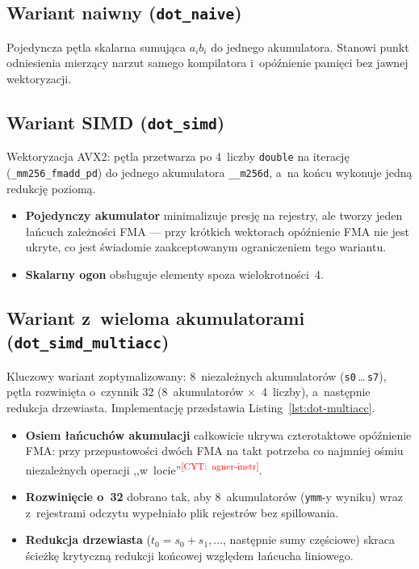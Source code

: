 \documentclass[a4paper,12pt]{book} %
\newcommand{\todocite}[1]{\textsuperscript{\textcolor{red}{[CYT:~#1]}}}
\newcommand{\kod}[1]{\texttt{#1}}
\begin{document}
\subsection{Wariant naiwny (\kod{dot\_naive})}
Pojedyncza pętla skalarna sumująca $a_i b_i$ do jednego akumulatora. Stanowi
punkt odniesienia mierzący narzut samego kompilatora i~opóźnienie pamięci bez
jawnej wektoryzacji.

\subsection{Wariant SIMD (\kod{dot\_simd})}
Wektoryzacja AVX2: pętla przetwarza po 4~liczby \kod{double} na iterację
(\kod{\_mm256\_fmadd\_pd}) do jednego akumulatora \kod{\_\_m256d}, a~na końcu
wykonuje jedną redukcję poziomą.
\begin{itemize}
\item \textbf{Pojedynczy akumulator} minimalizuje presję na rejestry, ale tworzy
  jeden łańcuch zależności FMA --- przy krótkich wektorach opóźnienie FMA nie
  jest ukryte, co jest świadomie zaakceptowanym ograniczeniem tego wariantu.
\item \textbf{Skalarny ogon} obsługuje elementy spoza wielokrotności~4.
\end{itemize}

\subsection{Wariant z~wieloma akumulatorami (\kod{dot\_simd\_multiacc})}
Kluczowy wariant zoptymalizowany: 8~niezależnych akumulatorów
(\kod{s0}\,\ldots\,\kod{s7}), pętla rozwinięta o~czynnik 32 (8~akumulatorów
$\times$~4~liczby), a~następnie redukcja drzewiasta. Implementację przedstawia
Listing~\ref{lst:dot-multiacc}.
\begin{itemize}
\item \textbf{Osiem łańcuchów akumulacji} całkowicie ukrywa czterotaktowe
  opóźnienie FMA: przy przepustowości dwóch FMA na takt potrzeba co najmniej
  ośmiu niezależnych operacji ,,w~locie''\todocite{agner-instr}.
\item \textbf{Rozwinięcie o~32} dobrano tak, aby 8~akumulatorów
  (\kod{ymm}-y wyniku) wraz z~rejestrami odczytu wypełniało plik rejestrów bez
  spillowania.
\item \textbf{Redukcja drzewiasta} ($t_0{=}s_0{+}s_1,\ldots$, następnie sumy
  częściowe) skraca ścieżkę krytyczną redukcji końcowej względem łańcucha
  liniowego.
\end{itemize}
\end{document}
